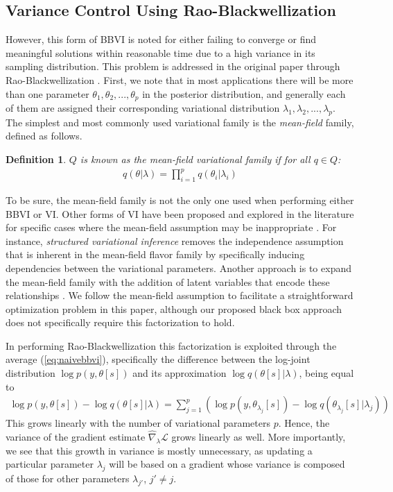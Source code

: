 \documentclass{article}
\newtheorem{definition}{Definition}
\begin{document}
\subsection{Variance Control Using Rao-Blackwellization}

However, this form of BBVI is noted for either failing to converge or find meaningful solutions within reasonable time due to a high variance in its sampling distribution. This problem is addressed in the original paper through Rao-Blackwellization \cite{Casella-1996}. First, we note that in most applications there will be more than one parameter $\theta_1, \theta_2, ..., \theta_p$ in the posterior distribution, and generally each of them are assigned their corresponding variational distribution $\lambda_1, \lambda_2, ..., \lambda_p$. The simplest and most commonly used \cite{Blei-2017} variational family is the \textit{mean-field} family, defined as follows.

\begin{definition}
  $Q$ is known as the \emph{mean-field variational family} if for all $q \in Q$:
  \begin{align}
      q(\theta | \lambda) = \prod^{p}_{i=1} q(\theta_i | \lambda_i)
  \end{align}
\end{definition}

To be sure, the mean-field family is not the only one used when performing either BBVI or VI. Other forms of VI have been proposed and explored in the literature for specific cases where the mean-field assumption may be inappropriate \cite{Blei-2017}. For instance, \textit{structured variational inference} \cite{Saul-1995, Barber-1998} removes the independence assumption that is inherent in the mean-field flavor family by specifically inducing dependencies between the variational parameters. Another approach is to expand the mean-field family with the addition of latent variables that encode these relationships \cite{Bishop-1997}. We follow the mean-field assumption to facilitate a straightforward optimization problem in this paper, although our proposed black box approach does not specifically require this factorization to hold.

In performing Rao-Blackwellization this factorization is exploited through the average (\ref{eq:naivebbvi}), specifically the difference between the log-joint distribution $\log p(y, \theta[s])$ and its approximation $\log q(\theta[s] | \lambda)$, being equal to
\begin{align*}
    \log p(y, \theta[s]) - \log q(\theta[s] | \lambda) = \sum^{p}_{j=1} (\log p(y, \theta_{\lambda_j}[s]) - \log q(\theta_{\lambda_j}[s] | \lambda_j))
\end{align*}
This grows linearly with the number of variational parameters $p$. Hence, the variance of the gradient estimate $\hat{\nabla}_\lambda\mathcal{L}$ grows linearly as well. More importantly, we see that this growth in variance is mostly unnecessary, as updating a particular parameter $\lambda_j$ will be based on a gradient whose variance is composed of those for other parameters $\lambda_{j'}$, $j' \neq j$.
\end{document}
